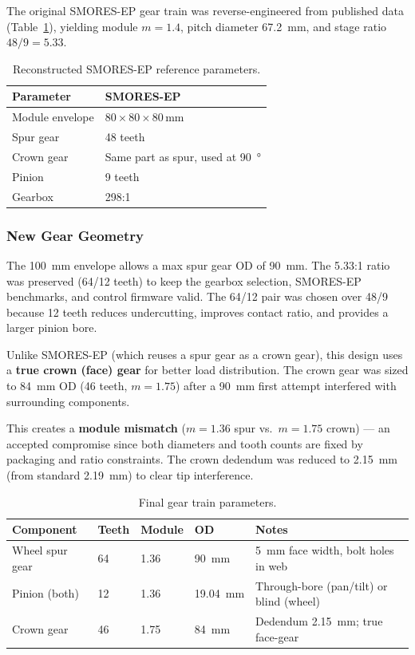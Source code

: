 \documentclass[12pt,a4paper]{article}
\begin{document}
The original SMORES-EP gear train was reverse-engineered from published data (Table~\ref{tab:smores-ref}), yielding module $m = 1.4$, pitch diameter \SI{67.2}{mm}, and stage ratio $48/9 = 5.33$.

\begin{table}[H]
	\centering
	\caption{Reconstructed SMORES-EP reference parameters.}
	\label{tab:smores-ref}
	\begin{tabular}{ll}
		\toprule
		\textbf{Parameter} & \textbf{SMORES-EP} \\
		\midrule
		Module envelope & $80 \times 80 \times 80$\,mm \\
		Spur gear       & 48 teeth \\
		Crown gear      & Same part as spur, used at \SI{90}{\degree} \\
		Pinion          & 9 teeth \\
		Gearbox         & 298:1 \\
		\bottomrule
	\end{tabular}
\end{table}

\subsubsection{New Gear Geometry}

The \SI{100}{mm} envelope allows a max spur gear OD of \SI{90}{mm}. The 5.33:1 ratio was preserved (64/12 teeth) to keep the gearbox selection, SMORES-EP benchmarks, and control firmware valid. The 64/12 pair was chosen over 48/9 because 12 teeth reduces undercutting, improves contact ratio, and provides a larger pinion bore.

Unlike SMORES-EP (which reuses a spur gear as a crown gear), this design uses a \textbf{true crown (face) gear} for better load distribution. The crown gear was sized to \SI{84}{mm} OD (46 teeth, $m = 1.75$) after a \SI{90}{mm} first attempt interfered with surrounding components.

This creates a \textbf{module mismatch} ($m = 1.36$ spur vs.\ $m = 1.75$ crown) --- an accepted compromise since both diameters and tooth counts are fixed by packaging and ratio constraints. The crown dedendum was reduced to \SI{2.15}{mm} (from standard \SI{2.19}{mm}) to clear tip interference.

\begin{table}[H]
	\centering
	\caption{Final gear train parameters.}
	\label{tab:final-params}
	\begin{tabular}{llllp{4.0cm}}
		\toprule
		\textbf{Component} & \textbf{Teeth} & \textbf{Module} & \textbf{OD} & \textbf{Notes} \\
		\midrule
		Wheel spur gear & 64 & \num{1.36} & \SI{90}{mm} &
		\SI{5}{mm} face width, bolt holes in web \\
		\addlinespace
		Pinion (both) & 12 & \num{1.36} & \SI{19.04}{mm} &
		Through-bore (pan/tilt) or blind (wheel) \\
		\addlinespace
		Crown gear & 46 & \num{1.75} & \SI{84}{mm} &
		Dedendum \SI{2.15}{mm}; true face-gear \\
		\bottomrule
	\end{tabular}
\end{table}
\end{document}
